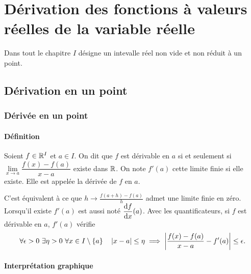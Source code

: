 \chapter[Dérivation des fonctions de la variable réelle]{Dérivation des fonctions à valeurs réelles de la variable réelle} 
\minitoc
\minilof
\minilot
Dans tout le chapitre $I$ désigne un intevalle réel non vide et non réduit à un point.
\section{Dérivation en un point}
\subsection{Dérivée en un point}
\subsubsection{Définition}
\begin{defdef}
  Soient $f \in \mathbb{R}^I$ et $a \in I$. On dit que $f$ est dérivable en $a$ si et seulement si $\lim\limits_{x \to a} \dfrac{f(x)-f(a)}{x-a}$ existe dans $\mathbb{R}$. On note $f'(a)$ cette limite finie si elle existe. Elle est appelée la dérivée de $f$ en $a$.
\end{defdef}
C'est équivalent à ce que $h \longrightarrow \frac{f(a+h)-f(a)}{h}$ admet une limite finie en zéro. Lorsqu'il existe $f'(a)$ est aussi noté $\dfrac{\mathrm{d} f}{\mathrm{d} x}(a)$. Avec les quantificateurs, si $f$ est dérivable en $a$, $f'(a)$ vérifie
\begin{equation}
  \forall \epsilon >0 \ \exists \eta > 0 \ \forall x \in I\setminus\{a\} \quad \left\lvert x-a\right\rvert \leq \eta \implies \left\lvert\frac{f(x)-f(a)}{x-a} - f'(a)\right\rvert \leq \epsilon.
\end{equation}

\subsubsection{Interprétation graphique}

